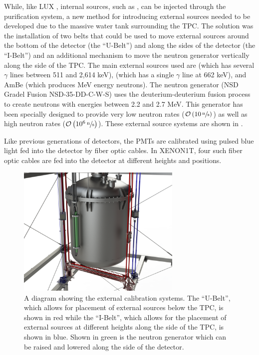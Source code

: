 While, like LUX \cite{akerib201783}, internal sources, such as , can be injected through the purification system, a new method for introducing external sources needed to be developed due to the massive water tank surrounding the TPC.  The solution was the installation of two belts that could be used to move external sources around the bottom of the detector (the ``U-Belt'') and along the sides of the detector (the ``I-Belt'') and an additional mechanism to move the neutron generator vertically along the side of the TPC.  The main external sources used are  (which has several $\gamma$ lines between 511 and 2,614 keV),  (which has a single $\gamma$ line at 662 keV), and AmBe (which produces MeV energy neutrons).  The neutron generator (NSD Gradel Fusion NSD-35-DD-C-W-S) uses the deuterium-deuterium fusion process to create neutrons with energies between 2.2 and 2.7 MeV.  This generator has been specially designed to provide very low neutron rates ($\mathcal{O} \left(10 \, \sfrac{\textrm{n}}{\textrm{s}} \right)$) as well as high neutron rates ($\mathcal{O} \left(10^6 \, \sfrac{\textrm{n}}{\textrm{s}} \right)$).  These external source systems are shown in .

Like previous generations of detectors, the PMTs are calibrated using pulsed blue light fed into the detector by fiber optic cables.  In XENON1T, four such fiber optic cables are fed into the detector at different heights and positions.


 \begin{figure}[t]
	\centering
	\includegraphics[width=0.7\textwidth]{xe1t_external_sources}
	\caption{A diagram showing the external calibration systems.  The ``U-Belt'', which allows for placement of external sources below the TPC, is shown in red while the ``I-Belt'', which allows for the placement of external sources at different heights along the side of the TPC, is shown in blue.  Shown in green is the neutron generator which can be raised and lowered along the side of the detector.}
	\label{fig:xe1t_external_sources}
\end{figure}
 

